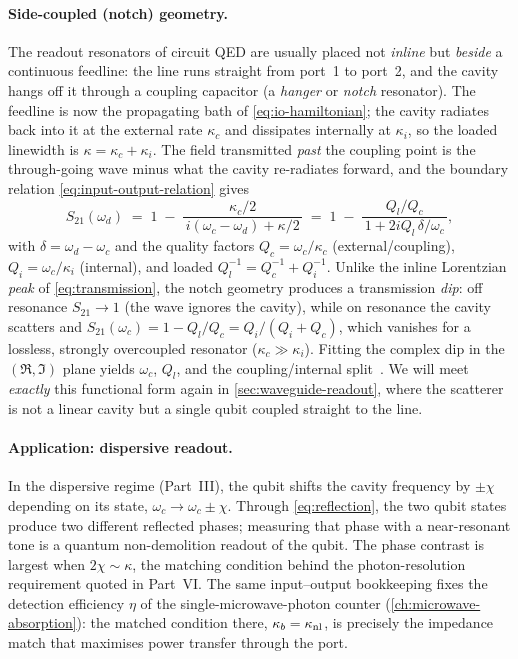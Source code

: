 \paragraph{Side-coupled (notch) geometry.}
The readout resonators of circuit QED are usually placed not
\emph{inline} but \emph{beside} a continuous feedline: the line runs
straight from port~1 to port~2, and the cavity hangs off it through a
coupling capacitor (a \emph{hanger} or \emph{notch} resonator). The
feedline is now the propagating bath of \cref{eq:io-hamiltonian}; the
cavity radiates back into it at the external rate $\kappa_c$ and
dissipates internally at $\kappa_i$, so the loaded linewidth is
$\kappa=\kappa_c+\kappa_i$. The field transmitted \emph{past} the
coupling point is the through-going wave minus what the cavity
re-radiates forward, and the boundary relation
\cref{eq:input-output-relation} gives
\begin{equation}
\label{eq:notch-s21}
S_{21}(\omega_d) \;=\; 1 \;-\; \frac{\kappa_c/2}{\,i(\omega_c-\omega_d)+\kappa/2\,}
\;=\; 1 \;-\; \frac{Q_l/Q_c}{\,1+2iQ_l\,\delta/\omega_c\,},
\end{equation}
with $\delta=\omega_d-\omega_c$ and the quality factors
$Q_c=\omega_c/\kappa_c$ (external/coupling), $Q_i=\omega_c/\kappa_i$
(internal), and loaded $Q_l^{-1}=Q_c^{-1}+Q_i^{-1}$. Unlike the inline
Lorentzian \emph{peak} of \cref{eq:transmission}, the notch geometry
produces a transmission \emph{dip}: off resonance $S_{21}\to1$ (the
wave ignores the cavity), while on resonance the cavity scatters and
$S_{21}(\omega_c)=1-Q_l/Q_c=Q_i/(Q_i+Q_c)$, which vanishes for a
lossless, strongly overcoupled resonator ($\kappa_c\gg\kappa_i$).
Fitting the complex dip in the $(\Re,\Im)$ plane yields $\omega_c$,
$Q_l$, and the coupling/internal split~\cite{gao2008,probst2015}. We
will meet \emph{exactly} this functional form again in
\cref{sec:waveguide-readout}, where the scatterer is not a linear
cavity but a single qubit coupled straight to the line.

\paragraph{Application: dispersive readout.}
In the dispersive regime (Part~III), the qubit shifts the cavity
frequency by $\pm\chi$ depending on its state, $\omega_c\to\omega_c\pm\chi$.
Through \cref{eq:reflection}, the two qubit states produce two
different reflected phases; measuring that phase with a
near-resonant tone is a quantum non-demolition readout of the qubit.
The phase contrast is largest when $2\chi\sim\kappa$, the matching
condition behind the photon-resolution requirement quoted in
Part~VI. The same input--output bookkeeping fixes the detection
efficiency $\eta$ of the single-microwave-photon counter
(\cref{ch:microwave-absorption}): the matched condition there,
$\kappa_b=\kappa_{\rm nl}$, is precisely the impedance match that
maximises power transfer through the port.


